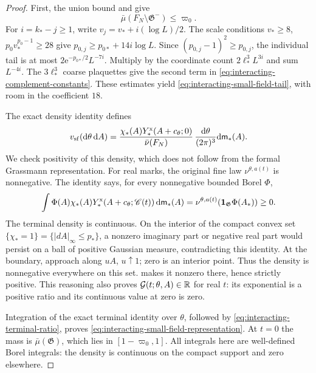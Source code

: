 \begin{proof}
First, the union bound and
\cite[(7)]{TerminalPressure} give
\begin{equation}\label{eq:interacting-small-field-tail}
 \bar\mu(F_N\setminus\mathfrak G^-)\le\varpi_0 .
\end{equation}
For $i=k_*-j\ge1$, write
$v_j=v_*+i(\log L)/2$.
The scale conditions
$v_*\ge8$, $p_0v_*^{p_0-1}\ge28$ give
$p_{0,j}\ge p_{0*}+14i\log L$.
Since $(p_{0,j}-1)^2\ge p_{0,j}$,
the individual tail is at most
$2\mathrm e^{-p_{0*}/2}L^{-7i}$.
Multiply by the coordinate count
$2\ell_*^3L^{3i}$ and sum $L^{-4i}$.
The $3\ell_*^3$ coarse plaquettes give the
second term in \eqref{eq:interacting-complement-constants}.
These estimates yield \eqref{eq:interacting-small-field-tail},
with room in the coefficient $18$.

The exact density identity defines
\begin{equation}\label{eq:interacting-small-field-measure}
 v_{\rm sf}(\mathrm d\theta\,\mathrm d A)=
   \frac{\chi_*(A)Y_*^{\rm x}(A+c_\theta;0)}
             {\bar\nu(F_N)}\,\frac{\mathrm d\theta}{(2\pi)^3}
                                      \mathrm d\mathsf m_*(A).
\end{equation}
We check positivity of this density, which
does not follow from the formal Grassmann
representation. For real marks, the original
fine law $\nu^{\theta,a(t)}$ is nonnegative.
The identity \cite[(21)]{TerminalPressure} says, for every
nonnegative bounded Borel $\Phi$,
\[
 \int\Phi(A)\chi_*(A)Y_*^{\rm x}(A+c_\theta;\mathscr C(t))
                \,\mathrm d\mathsf m_*(A)
       =\nu^{\theta,a(t)}(\mathbf1_{\mathfrak G}\Phi(A_*))\ge0.
\]
The terminal density is continuous. On the
interior of the compact convex set
$\{\chi_*=1\}=\{|dA|_\infty\le p_*\}$, a
nonzero imaginary part or negative real
part would persist on a ball of positive
Gaussian measure, contradicting this identity.
At the boundary, approach along $uA$,
$u\uparrow1$; zero is an interior point.
Thus the density is nonnegative everywhere
on this set. 
makes it nonzero there, hence strictly positive.
This reasoning also proves
$\mathcal G(t;\theta,A)\in\mathbb R$ for real $t$:
its exponential is a positive ratio and its
continuous value at zero is zero.

Integration of the exact terminal identity over
$\theta$, followed by
\eqref{eq:interacting-terminal-ratio}, proves
\eqref{eq:interacting-small-field-representation}.
At $t=0$ the mass is $\bar\mu(\mathfrak G)$,
which lies in $[1-\varpi_0,1]$.
All integrals here are well-defined Borel
integrals: the density is continuous on
the compact support and zero elsewhere.


\end{proof}
